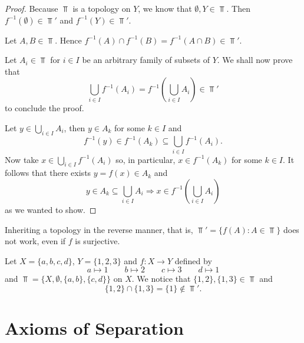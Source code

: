 \documentclass[../../main/main.tex]{subfiles}
\begin{document}
\begin{proof}
  Because $\Top$ is a topology on $Y$, we know that $\emptyset, Y \in \Top$. Then $f^{-1}(\emptyset) \in \Top'$ and $f^{-1}(Y) \in \Top'$.

  Let $A, B \in \Top$. Hence $f^{-1}(A) \cap f^{-1}(B) = f^{-1} ( A \cap B ) \in \Top'$.

  Let $A_{i} \in \Top$ for $i \in I$ be an arbitrary family of subsets of $Y$. We shall now prove that
  \begin{equation*}
    \bigcup_{i \in I} f^{-1}(A_{i}) = f^{-1} \left( \bigcup_{i \in I} A_{i} \right) \in \Top'
  \end{equation*}
  to conclude the proof.

  Let $y \in \bigcup_{i \in I} A_{i}$, then $y \in A_{k}$ for some $k \in I$ and
  \begin{equation*}
    f^{-1}(y) \in f^{-1}(A_{k}) \subseteq \bigcup_{i \in I} f^{-1} \left( A_{i} \right).
  \end{equation*}
  Now take $x \in \bigcup_{i \in I} f^{-1}(A_{i})$ so, in particular, $x \in f^{-1}(A_{k})$ for some $k \in I$. It follows that there exists $y = f(x) \in A_{k}$ and
  \begin{equation*}
    y \in A_{k} \subseteq \bigcup_{i \in I} A_{i} \Rightarrow x \in f^{-1} \left( \bigcup_{i \in I} A_{i} \right)
  \end{equation*}
  as we wanted to show.
\end{proof}

\begin{remark}
  Inheriting a topology in the reverse manner, that is, $\Top' = \{f(A) : A \in \Top\}$ does not work, even if $f$ is surjective.
\end{remark}

\begin{example}
  Let $X = \{a, b, c, d\}$, $Y = \{1, 2, 3\}$ and $f: X \rightarrow Y$ defined by
  \begin{equation*}
    a \mapsto 1 \quad \quad b \mapsto 2 \quad \quad c \mapsto 3 \quad \quad d \mapsto 1
  \end{equation*}
  and $\Top = \{ X, \emptyset, \{a, b\}, \{c, d\} \}$ on $X$. We notice that $\{1, 2\}, \{1, 3\} \in \Top$ and
  \begin{equation*}
    \{1, 2\} \cap \{1, 3\} = \{1\} \notin \Top'.
  \end{equation*}
\end{example}

\section{Axioms of Separation}
\label{sec:axioms-of-separation}
\end{document}
